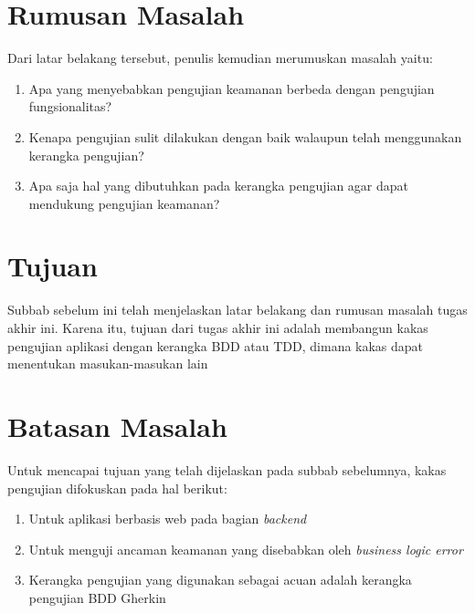 \section{Rumusan Masalah}

Dari latar belakang tersebut, penulis kemudian merumuskan masalah yaitu:

\begin{enumerate}
    \item Apa yang menyebabkan pengujian keamanan berbeda dengan pengujian fungsionalitas?
    \item Kenapa pengujian sulit dilakukan dengan baik walaupun telah menggunakan kerangka pengujian?
    \item Apa saja hal yang dibutuhkan pada kerangka pengujian agar dapat mendukung pengujian keamanan?
\end{enumerate}

\section{Tujuan}

Subbab sebelum ini telah menjelaskan latar belakang dan rumusan masalah tugas akhir ini.
Karena itu, tujuan dari tugas akhir ini adalah membangun kakas pengujian aplikasi
dengan kerangka BDD atau TDD, dimana kakas dapat menentukan masukan-masukan lain 

\section{Batasan Masalah}

Untuk mencapai tujuan yang telah dijelaskan pada subbab sebelumnya, kakas pengujian difokuskan pada hal berikut:

\begin{enumerate}
    \item Untuk aplikasi berbasis web pada bagian \emph{backend}
    \item Untuk menguji ancaman keamanan yang disebabkan oleh \emph{business logic error}
    \item Kerangka pengujian yang digunakan sebagai acuan adalah kerangka pengujian BDD Gherkin
\end{enumerate}

